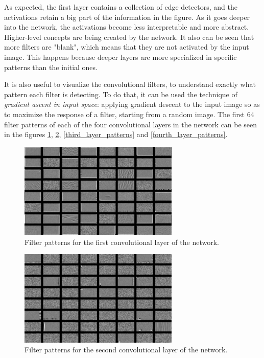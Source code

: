 \documentclass[journal]{IEEEtran}
\begin{document}
As expected, the first layer contains a collection of edge detectors, and the activations retain a big part of the information in the figure. As it goes deeper into the network, the activations become less interpretable and more abstract. Higher-level concepts are being created by the network. It also can be seen that more filters are "blank", which means that they are not activated by the input image. This happens because deeper layers are more specialized in specific patterns than the initial ones.

It is also useful to visualize the convolutional filters, to understand exactly what pattern each filter is detecting. To do that, it can be used the technique of \textit{gradient ascent in input space}\cite{Yosinski2015UnderstandingNN}: applying gradient descent to the input image so as to maximize the response of a filter, starting from a random image. The first 64 filter patterns of each of the four convolutional layers in the network can be seen in the figures \ref{first_layer_patterns}, \ref{second_layer_patterns}, \ref{third_layer_patterns} and \ref{fourth_layer_patterns}.

\begin{figure}[!t]
\centering
\includegraphics[width=3in]{images/conv2d_1_filter_activation.png}
\caption{Filter patterns for the first convolutional layer of the network.}
\label{first_layer_patterns}
\end{figure}

\begin{figure}[!t]
\centering
\includegraphics[width=3in]{images/conv2d_2_filter_activation.png}
\caption{Filter patterns for the second convolutional layer of the network.}
\label{second_layer_patterns}
\end{figure}
\end{document}
